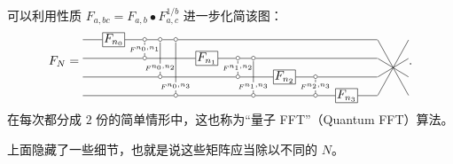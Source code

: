 可以利用性质 $F_{a,bc} = F_{a,b} \bullet F_{a,c}^{1/b}$ 进一步化简该图：
\[
   F_N =
\begin{tikzpicture}[baseline=-2em, x=2.5em, y=1.5em, inner sep=1pt]
    \foreach \i in {0,...,3} {
        \node[rectangle,draw] (H\i) at (3.25*\i-\i*\i/4,-\i) {$F_{n_\i}$};
        \node[inner sep=0pt, minimum size=0pt] (L\i) at (-1,-\i) {};
        \node[inner sep=0pt, minimum size=0pt] (s\i) at (8.5,-\i) {};
        \node[inner sep=0pt, minimum size=0pt] (r\i) at (9.5,-\i) {};
    }
    \foreach \i in {0, 1, 2} {
        \pgfmathtruncatemacro{\j}{\i+1}
        \foreach \k in {\j,...,3} {
            \node[inner sep=0pt, minimum size=0pt] (b\i\k) at (1/2+2.75*\i-\i*\i/4+\k/2,-\i) {$\sbullet$};
            \node[inner sep=0pt, minimum size=0pt] (c\i\k) at (1/2+2.75*\i-\i*\i/4+\k/2,-\k) {$\sbullet$};
        }
    }
    \node (D00) at (1,-.5) {$\scriptscriptstyle F^{n_0, n_1}$};
    \node (D01) at (1.5,-1.5) {$\scriptscriptstyle F^{n_0, n_2}$};
    \node (D02) at (2,-2.5) {$\scriptscriptstyle F^{n_0, n_3}$};
    \draw (b01) -- (D00) -- (c01);
    \draw (b02) -- (D01) -- (c02);
    \draw (b03) -- (D02) -- (c03);
    \node (D10) at (4,-1.5) {$\scriptscriptstyle F^{n_1, n_2}$};
    \node (D11) at (4.5,-2.5) {$\scriptscriptstyle F^{n_1, n_3}$};
    \draw (b12) -- (D10) -- (c12);
    \draw (b13) -- (D11) -- (c13);
    \node (D20) at (6.5,-2.5) {$\scriptscriptstyle F^{n_2, n_3}$};
    \draw (b23) -- (D20) -- (c23);
    \draw (L0) -- (H0) -- (b01) -- (b02) -- (b03) -- (s0) -- (r3);
    \draw (L1) -- (c01) -- (H1) -- (b12) -- (b13) -- (s1) -- (r2);
    \draw (L2) -- (c02) -- (c12) -- (H2) -- (b23) -- (s2) -- (r1);
    \draw (L3) -- (c03) -- (c13) -- (c23) -- (H3) -- (s3) -- (r0);
\end{tikzpicture}
.
\]
在每次都分成 $2$ 份的简单情形中，这也称为“量子 FFT”（Quantum FFT）算法。

上面隐藏了一些细节，也就是说这些矩阵应当除以不同的 $N$。


